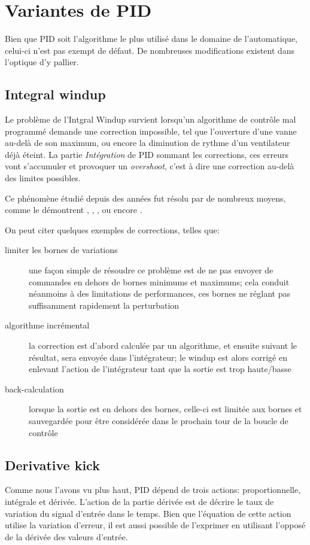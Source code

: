 \section{Variantes de PID}
\label{sec:alternatives-to-PID}
Bien que PID soit l'algorithme le plus utilisé dans le domaine de l'automatique, celui-ci n'est pas exempt de défaut. De nombreuses modifications existent dans l'optique d'y pallier.

\subsection{Integral windup}
Le problème de l'Intgral Windup survient lorsqu'un algorithme de contrôle mal programmé demande une correction impossible, tel que l'ouverture d'une vanne au-delà de son maximum, ou encore la diminution de rythme d'un ventilateur déjà éteint.
La partie \emph{Intégration} de PID sommant les corrections, ces erreurs vont s'accumuler et provoquer un \emph{overshoot}, c'est à dire une correction au-delà des limites possibles.

Ce phénomène étudié depuis des années fut résolu par de nombreux moyens, comme le démontrent \cite{ControlGuruIntegralWindup}, \cite{astrom1995pid}, \cite{shin2012anti}, ou encore \cite{bohn1995analysis}.

On peut citer quelques exemples de corrections, telles que:
\begin{description}
    \item[limiter les bornes de variations] une façon simple de résoudre ce problème est de ne pas envoyer de commandes en dehors de bornes minimums et maximums;
    cela conduit néanmoins à des limitations de performances, ces bornes ne réglant pas suffisamment rapidement la perturbation

    \item[algorithme incrémental] la correction est d'abord calculée par un algorithme, et ensuite suivant le résultat, sera envoyée dans l'intégrateur;
    le windup est alors corrigé en enlevant l'action de l'intégrateur tant que la sortie est trop haute/basse

    \item[back-calculation] lorsque la sortie est en dehors des bornes, celle-ci est limitée aux bornes et sauvegardée pour être considérée dans le prochain tour de la boucle de contrôle
\end{description}

\subsection{Derivative kick}
Comme nous l'avons vu plus haut, PID dépend de trois actions: proportionnelle, intégrale et dérivée.
L'action de la partie dérivée est de décrire le taux de variation du signal d'entrée dans le temps.
Bien que l'équation de cette action utilise la variation d'erreur, il est aussi possible de l'exprimer en utilisant l'opposé de la dérivée des valeurs d'entrée.


